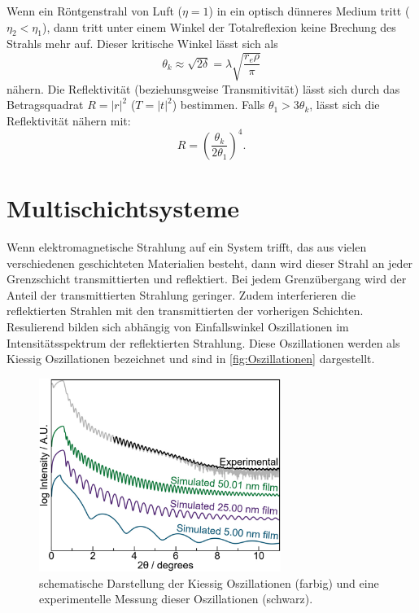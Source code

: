 Wenn ein Röntgenstrahl von Luft ($\eta = 1$) in ein optisch dünneres Medium tritt ($\eta_2 < \eta_1$), dann tritt unter einem Winkel der Totalreflexion
keine Brechung des Strahls mehr auf. Dieser kritische Winkel lässt sich als
\begin{equation}
    \theta_k \approx \sqrt{2\delta} = \lambda \sqrt{\frac{r_e \rho}{\pi}}
\end{equation}
nähern. 
Die Reflektivität (beziehunsgweise Transmitivität) lässt sich durch das Betragsquadrat $R = |r|^2$ ($T= |t|^2$) bestimmen. Falls $\theta_1 > 3 \theta_k$,
lässt sich die Reflektivität nähern mit:
\begin{equation}
    R = \left(\frac{\theta_k}{2\theta_1}\right)^4.
\end{equation}

\section{Multischichtsysteme}
Wenn elektromagnetische Strahlung auf ein System trifft, das aus vielen verschiedenen geschichteten Materialien besteht, dann wird dieser Strahl an jeder Grenzschicht transmittierten und reflektiert. 
Bei jedem Grenzübergang wird der Anteil der transmittierten Strahlung geringer. Zudem interferieren die reflektierten Strahlen mit den transmittierten der vorherigen Schichten. Resulierend bilden sich
abhängig von Einfallswinkel Oszillationen im Intensitätsspektrum der reflektierten Strahlung. Diese Oszillationen werden als Kiessig Oszillationen bezeichnet und sind in \autoref{fig:Oszillationen} dargestellt.
\begin{figure}
    \centering
    \includegraphics[width = 0.7\textwidth]{bilder/Oszillationen.jpg}
    \caption{schematische Darstellung der Kiessig Oszillationen (farbig) und eine experimentelle Messung dieser Oszillationen (schwarz)\cite{Kiessig}.}
    \label{fig:Oszillationen}
\end{figure}

